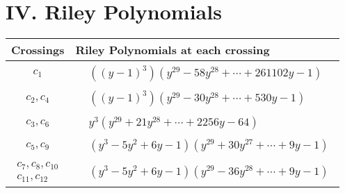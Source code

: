 \documentclass[1p]{elsarticle_modified}
\theoremstyle{definition}
\begin{document}
\centering \section*{ IV. Riley Polynomials}
\begin{tabular}{m{50pt}|m{274pt}}
Crossings & \hspace{64pt}Riley Polynomials at each crossing \\
\hline $$\begin{aligned}c_{1}\end{aligned}$$&$\begin{aligned}
&((y-1)^3)(y^{29}-58 y^{28}+\cdots+261102 y-1)
\end{aligned}$\\
\hline $$\begin{aligned}c_{2},c_{4}\end{aligned}$$&$\begin{aligned}
&((y-1)^3)(y^{29}-30 y^{28}+\cdots+530 y-1)
\end{aligned}$\\
\hline $$\begin{aligned}c_{3},c_{6}\end{aligned}$$&$\begin{aligned}
&y^3(y^{29}+21 y^{28}+\cdots+2256 y-64)
\end{aligned}$\\
\hline $$\begin{aligned}c_{5},c_{9}\end{aligned}$$&$\begin{aligned}
&(y^3-5 y^2+6 y-1)(y^{29}+30 y^{27}+\cdots+9 y-1)
\end{aligned}$\\
\hline $$\begin{aligned}c_{7},c_{8},c_{10}\\c_{11},c_{12}\end{aligned}$$&$\begin{aligned}
&(y^3-5 y^2+6 y-1)(y^{29}-36 y^{28}+\cdots+9 y-1)
\end{aligned}$\\
\hline
\end{tabular}
\vskip 2pc
\end{document}
